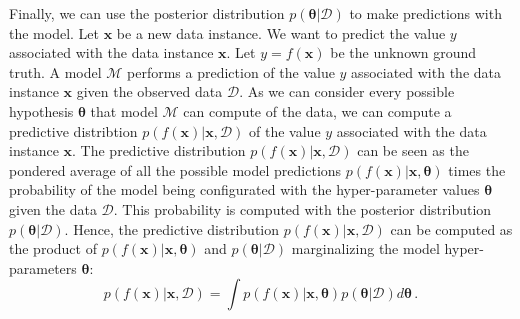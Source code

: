 Finally, we can use the posterior distribution $p(\boldsymbol{\theta}|\mathcal{D})$ to make predictions with the model. Let $\mathbf{x}$ be a new data instance. We want to predict the value $y$ associated with the data instance $\mathbf{x}$. Let $y = f(\mathbf{x})$ be the unknown ground truth. A model $\mathcal{M}$ performs a prediction of the value $y$ associated with the data instance $\mathbf{x}$ given the observed data $\mathcal{D}$. As we can consider every possible hypothesis $\boldsymbol{\theta}$ that model $\mathcal{M}$ can compute of the data, we can compute a predictive distribtion $p(f(\mathbf{x})|\mathbf{x}, \mathcal{D})$ of the value $y$ associated with the data instance $\mathbf{x}$. The predictive distribution $p(f(\mathbf{x})|\mathbf{x}, \mathcal{D})$ can be seen as the pondered average of all the possible model predictions $p(f(\mathbf{x})|\mathbf{x}, \boldsymbol{\theta})$ times the probability of the model being configurated with the hyper-parameter values $\boldsymbol{\theta}$ given the data $\mathcal{D}$. This probability is computed with the posterior distribution $p(\boldsymbol{\theta}|\mathcal{D})$. Hence, the predictive distribution $p(f(\mathbf{x})|\mathbf{x}, \mathcal{D})$ can be computed as the product of $p(f(\mathbf{x})|\mathbf{x}, \boldsymbol{\theta})$ and $p(\boldsymbol{\theta}|\mathcal{D})$ marginalizing the model hyper-parameters $\boldsymbol{\theta}$:
\begin{equation}
p(f(\mathbf{x})|\mathbf{x}, \mathcal{D}) = \int p(f(\mathbf{x})|\mathbf{x}, \boldsymbol{\theta}) p(\boldsymbol{\theta}|\mathcal{D}) d\boldsymbol{\theta}\,.
\end{equation}
